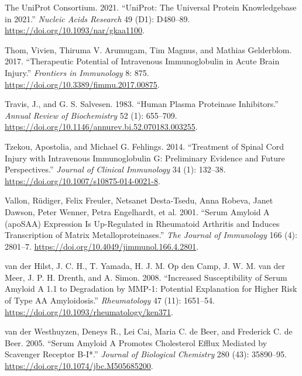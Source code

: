 \documentclass[9pt,lineno]{elife}
\newlength{\cslhangindent}
\newlength{\cslentryspacingunit} %
\newenvironment{CSLReferences}[2] %
 {%
  \setlength{\parindent}{0pt}
  \ifodd #1
  \let\oldpar\par
  \def\par{\hangindent=\cslhangindent\oldpar}
  \fi
  \setlength{\parskip}{#2\cslentryspacingunit}
 }%
 {}
\begin{document}
\begin{landscape}
\begin{landscape}
\begin{landscape}
\begin{landscape}
\begin{CSLReferences}{1}{0}
\leavevmode{}%
The UniProt Consortium. 2021. {``{UniProt}: The Universal Protein Knowledgebase in 2021.''} \emph{Nucleic Acids Research} 49 (D1): D480--89. \url{https://doi.org/10.1093/nar/gkaa1100}.

\leavevmode{}%
Thom, Vivien, Thiruma V. Arumugam, Tim Magnus, and Mathias Gelderblom. 2017. {``Therapeutic {Potential} of {Intravenous Immunoglobulin} in {Acute Brain Injury}.''} \emph{Frontiers in Immunology} 8: 875. \url{https://doi.org/10.3389/fimmu.2017.00875}.

\leavevmode{}%
Travis, J., and G. S. Salvesen. 1983. {``Human Plasma Proteinase Inhibitors.''} \emph{Annual Review of Biochemistry} 52 (1): 655--709. \url{https://doi.org/10.1146/annurev.bi.52.070183.003255}.

\leavevmode{}%
Tzekou, Apostolia, and Michael G. Fehlings. 2014. {``Treatment of {Spinal Cord Injury} with {Intravenous Immunoglobulin G}: {Preliminary Evidence} and {Future Perspectives}.''} \emph{Journal of Clinical Immunology} 34 (1): 132--38. \url{https://doi.org/10.1007/s10875-014-0021-8}.

\leavevmode{}%
Vallon, Rüdiger, Felix Freuler, Netsanet Desta-Tsedu, Anna Robeva, Janet Dawson, Peter Wenner, Petra Engelhardt, et al. 2001. {``Serum {Amyloid A} ({apoSAA}) {Expression Is Up-Regulated} in {Rheumatoid Arthritis} and {Induces Transcription} of {Matrix Metalloproteinases}.''} \emph{The Journal of Immunology} 166 (4): 2801--7. \url{https://doi.org/10.4049/jimmunol.166.4.2801}.

\leavevmode{}%
van der Hilst, J. C. H., T. Yamada, H. J. M. Op den Camp, J. W. M. van der Meer, J. P. H. Drenth, and A. Simon. 2008. {``Increased Susceptibility of Serum Amyloid {A} 1.1 to Degradation by {MMP-1}: Potential Explanation for Higher Risk of Type {AA} Amyloidosis.''} \emph{Rheumatology} 47 (11): 1651--54. \url{https://doi.org/10.1093/rheumatology/ken371}.

\leavevmode{}%
van der Westhuyzen, Deneys R., Lei Cai, Maria C. de Beer, and Frederick C. de Beer. 2005. {``Serum {Amyloid A Promotes Cholesterol Efflux Mediated} by {Scavenger Receptor B-I}*.''} \emph{Journal of Biological Chemistry} 280 (43): 35890--95. \url{https://doi.org/10.1074/jbc.M505685200}.


\end{CSLReferences}
\end{landscape}
\end{landscape}
\end{landscape}
\end{landscape}
\end{document}
